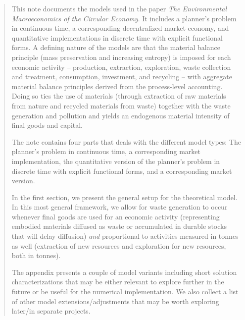 ﻿\begin{abstract}
\noindent
This note documents the models used in the paper  \emph{The Environmental Macroeconomics of the Circular Economy}. It includes a planner's problem in continuous time, a corresponding decentralized market economy, and quantitative implementations in discrete time with explicit functional forms. A defining nature of the models are that the material balance principle (mass preservation and increasing entropy) is imposed for each economic activity -- production, extraction, exploration, waste collection and treatment, consumption, investment, and recycling -- with aggregate material balance principles derived from the process-level accounting. Doing so ties the use of materials (through extraction of raw materials from nature and recycled materials from waste) together with the waste generation and pollution and yields an endogenous material intensity of final goods and capital. 


The note contains four parts that deals with the different model types: The planner's problem in continuous time, a corresponding market implementation, the quantitative version of the planner's problem in discrete time with explicit functional forms, and a corresponding market version. 


In the first section, we present the general setup for the theoretical model. In this most general framework, we allow for waste generation to occur whenever final goods are used for an economic activity (representing embodied materials diffused as waste or accumulated in durable stocks that will delay diffusion) \emph{and} proportional to activities measured in tonnes as well (extraction of new resources and exploration for new resources, both in tonnes).


The appendix presents a couple of model variants including short solution characterizations that may be either relevant to explore further in the future or be useful for the numerical implementation. We also collect a list of other model extensions/adjustments that may be worth exploring later/in separate projects. 
\end{abstract}